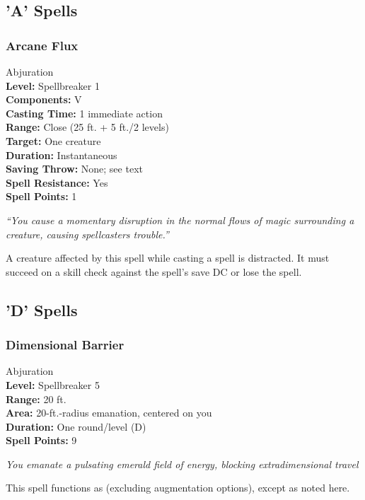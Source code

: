 \subsection{'A' Spells}
\subsubsection{Arcane Flux}
\label{Spell:ArcaneFlux}
Abjuration
\\ \textbf{Level:} Spellbreaker 1
\\ \textbf{Components:} V
\\ \textbf{Casting Time:} 1 immediate action
\\ \textbf{Range:} Close (25 ft. + 5 ft./2 levels)
\\ \textbf{Target:} One creature
\\ \textbf{Duration:} Instantaneous
\\ \textbf{Saving Throw:} None; see text
\\ \textbf{Spell Resistance:} Yes
\\ \textbf{Spell Points:} 1

\emph{``You cause a momentary disruption in the normal flows of magic surrounding a creature, causing spellcasters trouble.''}

A creature affected by this spell while casting a spell is distracted. It must succeed on a  skill check against the spell's save DC or lose the spell.
\subsection{'D' Spells}

\subsubsection{Dimensional Barrier}
\label{Spell:DimensionalBarrier}
Abjuration
\\ \textbf{Level:} Spellbreaker 5
\\ \textbf{Range:} 20 ft.
\\ \textbf{Area:} 20-ft.-radius emanation, centered on you
\\ \textbf{Duration:} One round/level (D)
\\ \textbf{Spell Points:} 9

\emph{You emanate a pulsating emerald field of energy, blocking extradimensional travel }

This spell functions as  (excluding augmentation options), except as noted here.

